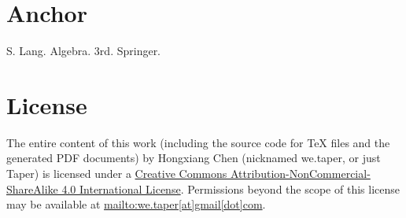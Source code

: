 \documentclass{article}
\numberwithin{equation}{subsection} %
\theoremstyle{definition}
\begin{document}
\section{Anchor}
\printnomenclature
\begin{thebibliography}{1}
     S. Lang. Algebra. 3rd. Springer.
\end{thebibliography}
\section{License}
The entire content of this work (including the source code
for TeX files and the generated PDF documents) by 
Hongxiang Chen (nicknamed we.taper, or just Taper) is
licensed under a 
\href{http://creativecommons.org/licenses/by-nc-sa/4.0/}{Creative 
Commons Attribution-NonCommercial-ShareAlike 4.0 International 
License}. Permissions beyond the scope of this 
license may be available at \url{mailto:we.taper[at]gmail[dot]com}.
\end{document}
